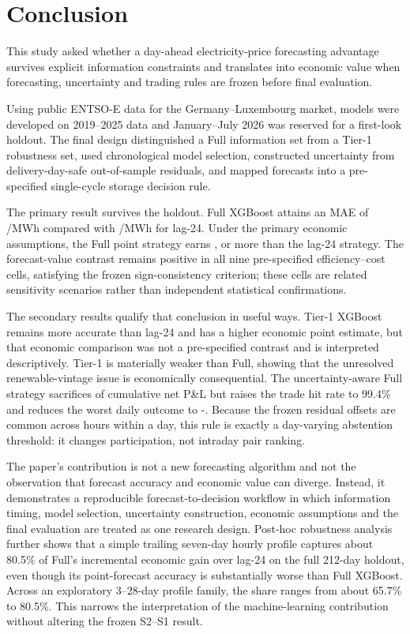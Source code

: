 \section{Conclusion}
\label{sec:conclusion}

This study asked whether a day-ahead electricity-price forecasting advantage survives explicit information constraints and translates into economic value when forecasting, uncertainty and trading rules are frozen before final evaluation.

Using public ENTSO-E data for the Germany--Luxembourg market, models were developed on 2019--2025 data and January--July 2026 was reserved for a first-look holdout. The final design distinguished a Full information set from a Tier-1 robustness set, used chronological model selection, constructed uncertainty from delivery-day-safe out-of-sample residuals, and mapped forecasts into a pre-specified single-cycle storage decision rule.

The primary result survives the holdout. Full XGBoost attains an MAE of /MWh compared with /MWh for lag-24. Under the primary economic assumptions, the Full point strategy earns , or  more than the lag-24 strategy. The forecast-value contrast remains positive in all nine pre-specified efficiency--cost cells, satisfying the frozen sign-consistency criterion; these cells are related sensitivity scenarios rather than independent statistical confirmations.

The secondary results qualify that conclusion in useful ways. Tier-1 XGBoost remains more accurate than lag-24 and has a higher economic point estimate, but that economic comparison was not a pre-specified contrast and is interpreted descriptively. Tier-1 is materially weaker than Full, showing that the unresolved renewable-vintage issue is economically consequential. The uncertainty-aware Full strategy sacrifices  of cumulative net P\&L but raises the trade hit rate to 99.4\% and reduces the worst daily outcome to -. Because the frozen residual offsets are common across hours within a day, this rule is exactly a day-varying abstention threshold: it changes participation, not intraday pair ranking.

The paper's contribution is not a new forecasting algorithm and not the observation that forecast accuracy and economic value can diverge. Instead, it demonstrates a reproducible forecast-to-decision workflow in which information timing, model selection, uncertainty construction, economic assumptions and the final evaluation are treated as one research design. Post-hoc robustness analysis further shows that a simple trailing seven-day hourly profile captures about 80.5\% of Full's incremental economic gain over lag-24 on the full 212-day holdout, even though its point-forecast accuracy is substantially worse than Full XGBoost. Across an exploratory 3--28-day profile family, the share ranges from about 65.7\% to 80.5\%. This narrows the interpretation of the machine-learning contribution without altering the frozen S2--S1 result.

